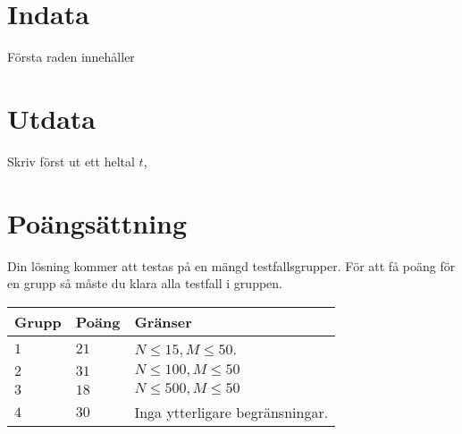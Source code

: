 \noindent



\noindent
\section*{Indata}
Första raden innehåller 

\section*{Utdata}
Skriv först ut ett heltal $t$, 

\section*{Poängsättning}
Din lösning kommer att testas på en mängd testfallsgrupper.
För att få poäng för en grupp så måste du klara alla testfall i gruppen.

\noindent
\begin{tabular}{| l | l | p{12cm} |}
  \hline
  \textbf{Grupp} & \textbf{Poäng} & \textbf{Gränser} \\ \hline
  $1$    & $21$         & $N \leq 15, M \leq 50$.  \\ \hline
  $2$    & $31$         & $N \leq 100, M \leq 50$ \\ \hline
  $3$    & $18$         & $N \leq 500, M \leq 50$ \\ \hline
  $4$    & $30$         & Inga ytterligare begränsningar. \\ \hline
\end{tabular}



